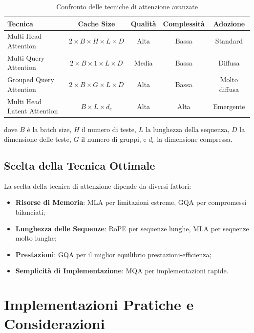 \begin{table}[htbp]
    \centering
    \begin{adjustbox}{width=\textwidth}
    \begin{tabular}{|l|c|c|c|c|}
    \hline
    \textbf{Tecnica} & \textbf{Cache Size} & \textbf{Qualità} & \textbf{Complessità} & \textbf{Adozione} \\
    \hline
    Multi Head Attention & $2 \times B \times H \times L \times D$ & Alta & Bassa & Standard \\
    Multi Query Attention & $2 \times B \times 1 \times L \times D$ & Media & Bassa & Diffusa \\
    Grouped Query Attention & $2 \times B \times G \times L \times D$ & Alta & Bassa & Molto diffusa \\
    Multi Head Latent Attention & $B \times L \times d_c$ & Alta & Alta & Emergente \\
    \hline
    \end{tabular}
    \end{adjustbox}
    \caption{Confronto delle tecniche di attenzione avanzate}
    \label{tab:attention_comparison}
\end{table}

dove $B$ è la batch size, $H$ il numero di teste, $L$ la lunghezza della sequenza, $D$ la dimensione delle teste, $G$ il numero di gruppi, e $d_c$ la dimensione compressa.

\subsection{Scelta della Tecnica Ottimale}
La scelta della tecnica di attenzione dipende da diversi fattori:

\begin{itemize}
    \item \textbf{Risorse di Memoria}: MLA per limitazioni estreme, GQA per compromessi bilanciati;
    \item \textbf{Lunghezza delle Sequenze}: RoPE per sequenze lunghe, MLA per sequenze molto lunghe;
    \item \textbf{Prestazioni}: GQA per il miglior equilibrio prestazioni-efficienza;
    \item \textbf{Semplicità di Implementazione}: MQA per implementazioni rapide.
\end{itemize}

\section{Implementazioni Pratiche e Considerazioni}

